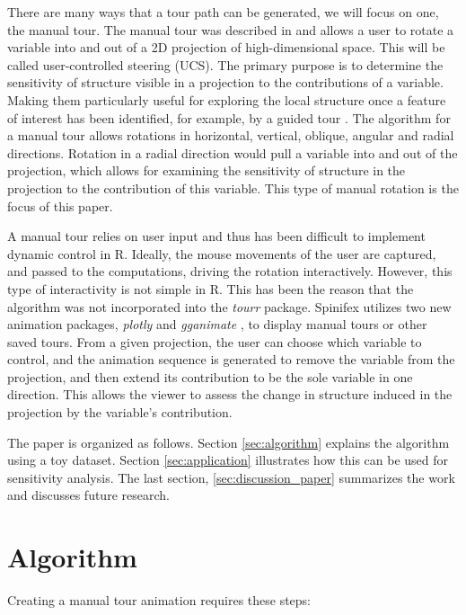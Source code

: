\documentclass{monashthesis}
\begin{document}
There are many ways that a tour path can be generated, we will focus on
one, the manual tour. The manual tour was described in
\textcite{cook_manual_1997} and allows a user to rotate a variable into
and out of a 2D projection of high-dimensional space. This will be
called user-controlled steering (UCS). The primary purpose is to
determine the sensitivity of structure visible in a projection to the
contributions of a variable. Making them particularly useful for
exploring the local structure once a feature of interest has been
identified, for example, by a guided tour \autocite{cook_grand_1995}.
The algorithm for a manual tour allows rotations in horizontal,
vertical, oblique, angular and radial directions. Rotation in a radial
direction would pull a variable into and out of the projection, which
allows for examining the sensitivity of structure in the projection to
the contribution of this variable. This type of manual rotation is the
focus of this paper.

A manual tour relies on user input and thus has been difficult to
implement dynamic control in R. Ideally, the mouse movements of the user
are captured, and passed to the computations, driving the rotation
interactively. However, this type of interactivity is not simple in R.
This has been the reason that the algorithm was not incorporated into
the \emph{tourr} package. Spinifex utilizes two new animation packages,
\emph{plotly} \autocite{sievert_plotly_2018} and \emph{gganimate}
\autocite{pedersen_gganimate:_2019}, to display manual tours or other
saved tours. From a given projection, the user can choose which variable
to control, and the animation sequence is generated to remove the
variable from the projection, and then extend its contribution to be the
sole variable in one direction. This allows the viewer to assess the
change in structure induced in the projection by the variable's
contribution.

The paper is organized as follows. Section \ref{sec:algorithm} explains
the algorithm using a toy dataset. Section \ref{sec:application}
illustrates how this can be used for sensitivity analysis. The last
section, \ref{sec:discussion_paper} summarizes the work and discusses
future research.

\section{Algorithm}\label{sec:algorithm_paper}

Creating a manual tour animation requires these steps:
\end{document}

